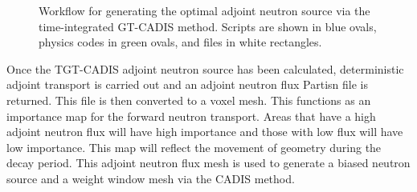 \begin{figure}
\begin{tikzpicture}[node distance = 2 cm, auto]
        \end{tikzpicture}

	\caption{Workflow for generating the optimal
	adjoint neutron source via the time-integrated GT-CADIS method.  Scripts are shown in
	blue ovals, physics codes in green ovals, and files in white
	rectangles.}
\end{figure}

Once the TGT-CADIS adjoint neutron source has been calculated, deterministic
adjoint transport is carried out and an adjoint neutron flux Partisn file is
returned.  This file is then converted to a voxel mesh.
This functions as an importance map for the forward neutron transport.  Areas
that have a high adjoint neutron flux will have high importance and those with
low flux will have low importance.  This map will reflect the movement of
geometry during the decay period.  This adjoint neutron flux mesh is used to
generate a biased neutron source and a weight window mesh via the CADIS method.


